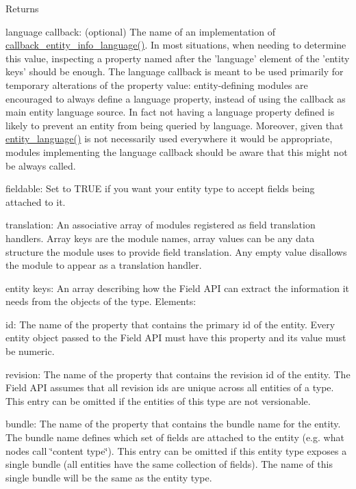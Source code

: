 \begin{DoxyReturn}{Returns}
\begin{DoxyItemize}
\item language callback: (optional) The name of an implementation of \hyperlink{group__callbacks_ga6e4c07daa3660701139f60cd79bb3665}{callback\_\-entity\_\-info\_\-language()}. In most situations, when needing to determine this value, inspecting a property named after the 'language' element of the 'entity keys' should be enough. The language callback is meant to be used primarily for temporary alterations of the property value: entity-\/defining modules are encouraged to always define a language property, instead of using the callback as main entity language source. In fact not having a language property defined is likely to prevent an entity from being queried by language. Moreover, given that \hyperlink{common_8inc_abd1bd4466071377d474040174c49f06b}{entity\_\-language()} is not necessarily used everywhere it would be appropriate, modules implementing the language callback should be aware that this might not be always called.
\item fieldable: Set to TRUE if you want your entity type to accept fields being attached to it.
\item translation: An associative array of modules registered as field translation handlers. Array keys are the module names, array values can be any data structure the module uses to provide field translation. Any empty value disallows the module to appear as a translation handler.
\item entity keys: An array describing how the Field API can extract the information it needs from the objects of the type. Elements:
\begin{DoxyItemize}
\item id: The name of the property that contains the primary id of the entity. Every entity object passed to the Field API must have this property and its value must be numeric.
\item revision: The name of the property that contains the revision id of the entity. The Field API assumes that all revision ids are unique across all entities of a type. This entry can be omitted if the entities of this type are not versionable.
\item bundle: The name of the property that contains the bundle name for the entity. The bundle name defines which set of fields are attached to the entity (e.g. what nodes call \char`\"{}content type\char`\"{}). This entry can be omitted if this entity type exposes a single bundle (all entities have the same collection of fields). The name of this single bundle will be the same as the entity type.

\end{DoxyItemize}
\end{DoxyItemize}
\end{DoxyReturn}

